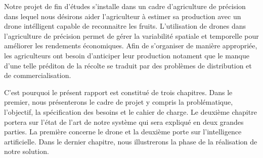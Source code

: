 


Notre projet de fin d'études s'installe dans un cadre d'agriculture de précision dans lequel nous désirons aider l'agriculteur à estimer sa production avec un drone intélligent capable de reconnaitre les fruits. L'utilisation de drones dans l'agriculture de précision permet de gérer la variabilité spatiale et temporelle pour améliorer les rendements économiques. Afin de s'organiser de manière appropriée, les agriculteurs ont besoin d'anticiper leur production notament que le manque d'une telle préditon de la récolte se traduit par des problèmes de distribution et de commercialisation.

C'est pourquoi le présent rapport est constitué de trois chapitres. 
Dans le premier, nous présenterons le cadre de projet y compris la problématique, l'objectif, la spécification des besoins et le cahier de charge. 
 Le deuxième chapitre portera sur l'état de l'art de notre système qui sera expliqué en deux grandes parties. La première concerne le drone et la deuxième porte sur l'intelligence artificielle. Dans le dernier chapitre, nous illustrerons la phase de la réalisation de notre solution.